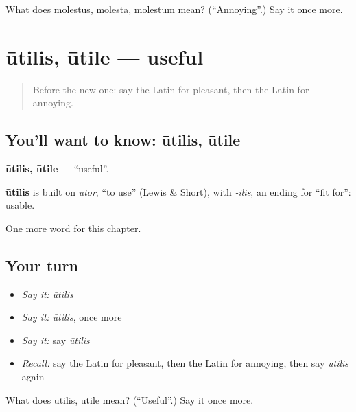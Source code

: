 \begin{tcolorbox}[breakable,colback=teal!4,colframe=teal!35!black,title={Before you move on}]
What does molestus, molesta, molestum mean? (\textquotedblleft{}Annoying\textquotedblright{}.) Say it once more.
\end{tcolorbox}
\section[ūtilis, ūtile]{ūtilis, ūtile — useful}

\label{lesson:LA-C146-utilis}



\begin{quote}
Before the new one: say the Latin for pleasant, then the Latin for annoying.
\end{quote}

\subsection*{You'll want to know: ūtilis, ūtile}
\textbf{ūtilis, ūtile} — \textquotedblleft{}useful\textquotedblright{}.

\begin{cousinweb}
\textbf{ūtilis} is built on \emph{ūtor}, \textquotedblleft{}to use\textquotedblright{} (Lewis \& Short), with \emph{-ilis}, an ending for \textquotedblleft{}fit for\textquotedblright{}: usable.
\end{cousinweb}

\begin{grammarlens}[title={What you've built}]
One more word for this chapter.
\end{grammarlens}

\subsection*{Your turn}
\begin{itemize}
\raggedright
  \item \emph{Say it:} \emph{ūtilis}
  \item \emph{Say it:} \emph{ūtilis}, once more
  \item \emph{Say it:} say \emph{ūtilis}
  \item \emph{Recall:} say the Latin for pleasant, then the Latin for annoying, then say \emph{ūtilis} again
\end{itemize}

\begin{tcolorbox}[breakable,colback=teal!4,colframe=teal!35!black,title={Before you move on}]
What does ūtilis, ūtile mean? (\textquotedblleft{}Useful\textquotedblright{}.) Say it once more.
\end{tcolorbox}
